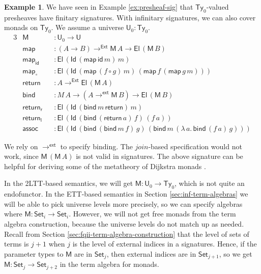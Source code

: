 \documentclass[12pt,a4paper,twoside,openany]{book}
\theoremstyle{remark}
\theoremstyle{definition}
\newtheorem{myexample}{Example}
\theoremstyle{theorem}
\newcommand{\mi}[1]{\mathit{#1}}
\newcommand{\ms}[1]{\mathsf{#1}}
\newcommand{\id}{\mathsf{id}}
\newcommand{\Ty}{\mathsf{Ty}}
\newcommand{\U}{\mathsf{U}}
\newcommand{\El}{\mathsf{El}}
\newcommand{\Id}{\mathsf{Id}}
\newcommand{\Set}{\mathsf{Set}}
\newcommand{\toe}{\to^{\ms{Ext}}}
\newcommand{\toinf}{\to^{\ms{ext}}}
\begin{document}
\begin{myexample}
We have seen in Example \ref{ex:presheaf-sig} that $\Ty_0$-valued presheaves have finitary signatures.
With infinitary signatures, we can also cover monads on $\Ty_0$. We assume a
universe $\U_0 : \Ty_0$.
\begingroup
\allowdisplaybreaks
\begin{alignat*}{3}
  &\ms{M}         &&: \U_0 \to \U\\
  &\ms{map}       &&: (A \to B) \toe \ms{M}\,A \to \El\,(\ms{M}\,B)\\
  &\ms{map_{id}}   &&: \El\,(\Id\,(\ms{map}\,\id\,m)\,m)\\
  &\ms{map_{\circ}} &&: \El\,(\Id\,(\ms{map}\,(f \circ g)\,m)\,(\ms{map}\,f\,(\ms{map}\,g\,m)))\\
  &\ms{return}    &&: A \toe \El\,(\ms{M}\,A)\\
  &\ms{bind}      &&: M\,A \to (A \toinf \ms{M}\,B) \to \El\,(\ms{M}\,B)\\
  &\ms{return_r}  &&: \El\,(\Id\,(\ms{bind}\,m\,\ms{return})\,m)\\
  &\ms{return_l}  &&: \El\,(\Id\,(\ms{bind}\,(\ms{return}\,a)\,f)\,(f\,a))\\
  &\ms{assoc}     &&: \El\,(\Id\,(\ms{bind}\,(\ms{bind}\,m\,f)\,g)\,(\ms{bind}\,m\,(\lambda\,a.\,\ms{bind}\,(f\,a)\,g)))
\end{alignat*}
\endgroup

We rely on $\toinf$ to specify binding. The $\mi{join}$-based specification
would not work, since $\ms{M}\,(\ms{M}\,A)$ is not valid in signatures. The
above signature can be helpful for deriving some of the metatheory of Dijkstra
monads \cite[Section~5]{dijkstramonad}.

In the 2LTT-based semantics, we will get $\ms{M} : \U_0 \to \Ty_0$, which is not
quite an endofunctor. In the ETT-based semantics in Section
\ref{sec:inf-term-algebras} we will be able to pick universe levels more
precisely, so we can specify algebras where $\ms{M} : \Set_i \to \Set_i$.
However, we will not get free monads from the term algebra construction, because
the universe levels do not match up as needed. Recall from Section
\ref{sec:fqii-term-algebra-construction} that the level of sets of terms is $j +
1$ when $j$ is the level of external indices in a signatures. Hence, if the
parameter types to $\ms{M}$ are in $\Set_j$, then external indices are in
$\Set_{j+1}$, so we get $\ms{M} : \Set_j \to \Set_{j+2}$ in the term algebra for
monads.

\end{myexample}
\end{document}

